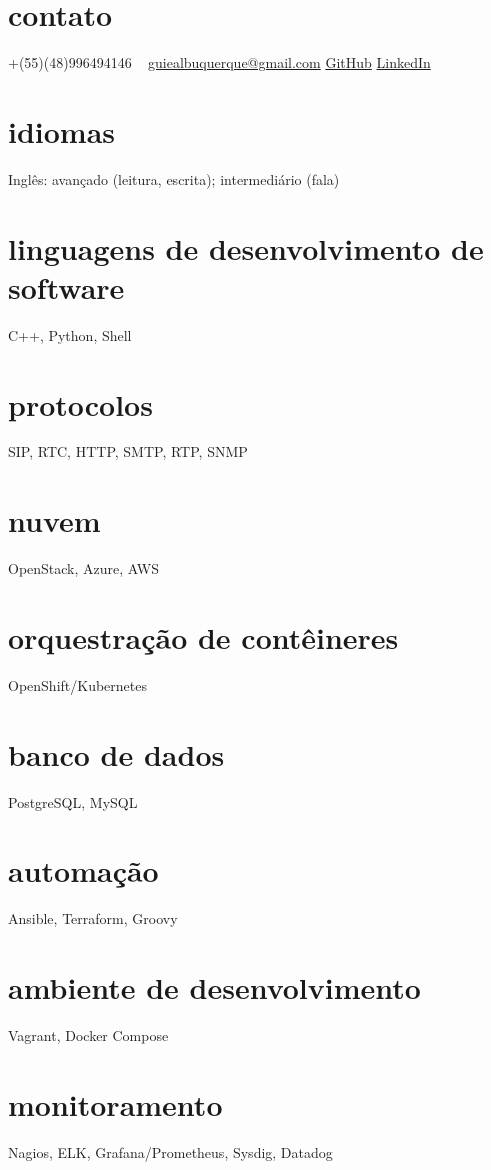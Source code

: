 \documentclass[]{friggeri-cv} %
\begin{document}



\begin{aside} %
\section{contato}
+(55)(48)996494146
~
\href{mailto:guiealbuquerque@gmail.com}{guiealbuquerque@gmail.com}
\href{https://github.com/heisendumb}{GitHub}
\href{https://www.linkedin.com/in/heisenbugger/}{LinkedIn}
\section{idiomas}
Inglês: avançado (leitura, escrita); intermediário (fala)
\section{linguagens de desenvolvimento de software}
C++, Python, Shell
\section{protocolos}
SIP, RTC, HTTP, SMTP, RTP, SNMP
\section{nuvem}
OpenStack, Azure, AWS
\section{orquestração de contêineres}
OpenShift/Kubernetes
\section{banco de dados}
PostgreSQL, MySQL
\section{automação}
Ansible, Terraform, Groovy
\section{ambiente de desenvolvimento}
Vagrant, Docker Compose
\section{monitoramento}
Nagios, ELK, Grafana/Prometheus, Sysdig, Datadog
\end{aside}
\end{document}
